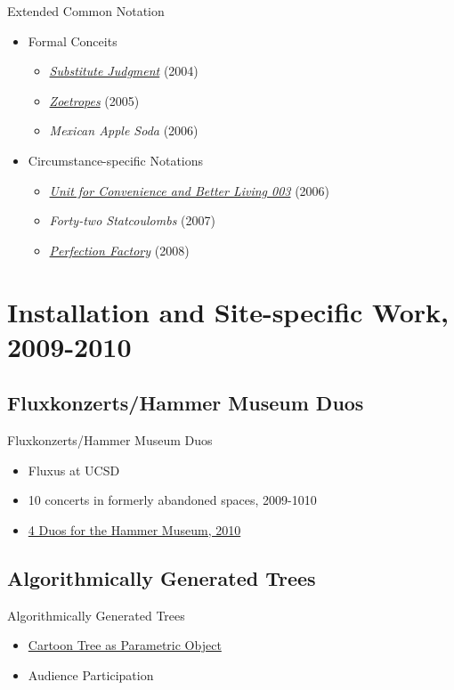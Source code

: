 \documentclass{beamer}
\begin{document}
\begin{frame}{Extended Common Notation}
  \begin{itemize}
  \item
    Formal Conceits
    \begin{itemize}
    \item<2->
    \emph{\href{sjmcForm}{Substitute Judgment}} (2004)
    \item<3->
    \emph{\href{zoetropes}{Zoetropes}} (2005)
    \item<4->
    \emph{Mexican Apple Soda} (2006)
   \end{itemize}
  \item<5->
    Circumstance-specific Notations
    \begin{itemize}
    \item<6->
    \emph{\href{unitA}{Unit for Convenience and Better Living 003}} (2006)
    \item<7->
    \emph{Forty-two Statcoulombs} (2007)
    \item<8->
    \emph{\href{pfmemory}{Perfection Factory}} (2008)
  \end{itemize}
  \end{itemize}
\end{frame}

\section{Installation and Site-specific Work, 2009-2010}
\subsection{Fluxkonzerts/Hammer Museum Duos}
\begin{frame}{Fluxkonzerts/Hammer Museum Duos}
	\begin{itemize}
		\item{Fluxus at UCSD}
		\pause
		\item{10 concerts in formerly abandoned spaces, 2009-1010}
		\pause
		\item{\href{hammer}{4 Duos for the Hammer Museum, 2010}}
	\end{itemize}
		
\end{frame}

\subsection{Algorithmically Generated Trees}
\begin{frame}{Algorithmically Generated Trees}
	\begin{itemize}
		\item{\href{trees}{Cartoon Tree as Parametric Object}}
		\pause
		\item{Audience Participation}
	\end{itemize}
\end{frame}
\end{document}
